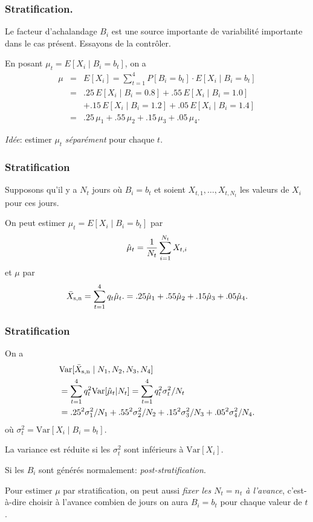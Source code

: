 \documentclass[t,usepdftitle=false]{beamer}
\def\Var{\mbox{Var}}
\begin{document}
\begin{frame}
\frametitle{Stratification.}

Le facteur d'achalandage ${B_i}$ est une source importante de variabilité 
importante dans le cas présent. Essayons de la contr\^oler.

\mbox{}

En posant $\mu_t = E[X_i\mid B_i=b_t]$, on a
\begin{eqnarray*}
 \mu &=& E[X_i]  = \sum_{t=1}^4 P[B_i = b_t]\cdot E[X_i\mid B_i=b_t] \\
     &=&  .25\, E[X_i\mid B_i=0.8] + .55\, E[X_i\mid B_i=1.0]  \\
     && + .15\, E[X_i\mid B_i=1.2] + .05\, E[X_i\mid B_i=1.4]  \\
     &=&  .25\,\mu_1 + .55\, \mu_2 + .15\, \mu_3 + .05\, \mu_4.
\end{eqnarray*}

\mbox{}

\emph{Idée}: estimer ${\mu_t}$ \emph{séparément} 
pour chaque $t$.

\end{frame}

\begin{frame}
\frametitle{Stratification}

Supposons qu'il y a ${N_t}$ jours o\`u $B_i = b_t$ et soient
${X_{t,1}},\dots, {X_{t,N_t}}$ les valeurs de $X_i$ pour ces jours. 

\mbox{}

On peut estimer $\mu_t = E[X_i\mid B_i=b_t]$ par
 $$ {\hat\mu_t} = {1\over N_t} \sum_{i=1}^{N_t} X_{t,i} $$
et $\mu$ par
\[
  {\bar X_{\rm{s},n}} = \sum_{t=1}^4 q_t \hat\mu_t.
           = .25 \hat\mu_1 + .55 \hat\mu_2 + .15 \hat\mu_3 + .05 \hat\mu_4.
\]

\end{frame}

\begin{frame}
\frametitle{Stratification}

On a 
\begin{align*}
  &  \Var[\bar X_{\rm{s},n} \mid N_1, N_2, N_3, N_4] \\
  &= \sum_{t=1}^4 q_t^2 \Var[\hat\mu_t | N_t]  
  = \sum_{t=1}^4 q_t^2 \sigma^2_t/N_t \\
  &= .25^2 \sigma^2_1/N_1 + .55^2 \sigma^2_2/N_2 + 
     .15^2 \sigma^2_3/N_3 + .05^2 \sigma^2_4/N_4.
\end{align*}
o\`u ${\sigma^2_t} = \Var[X_i\mid B_i=b_t]$.

\mbox{}

La variance est réduite si les $\sigma_t^2$ sont inférieurs \`a $\Var[X_i]$.

\mbox{}

Si les $B_i$ sont générés normalement: \emph{post-stratification}.

\mbox{}

Pour estimer $\mu$ par stratification, on peut aussi 
\emph{fixer les $N_t = n_t$ \`a l'avance}, c'est-\`a-dire choisir \`a
l'avance combien de jours on aura $B_i = b_t$ pour chaque valeur de
$t$.

\end{frame}
\end{document}
